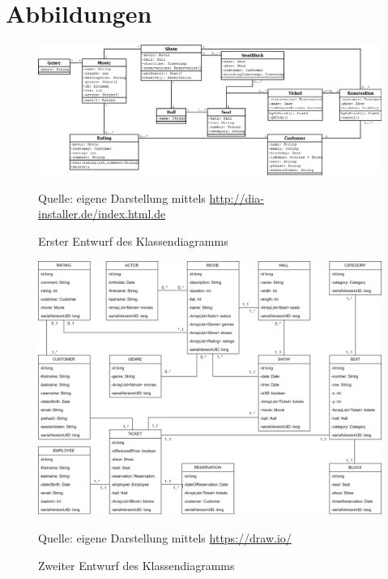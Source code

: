 \chapter{Abbildungen}
\begin{figure}
	\centering
	\includegraphics[keepaspectratio, width=\textwidth, height=\textheight]{img/klassendiagramm_v01}
	\captionsetup{format=hang}
	\caption{Erster Entwurf des Klassendiagramms}
	\small Quelle: eigene Darstellung mittels \url{http://dia-installer.de/index.html.de}
	\label{fig:anhang_klassendiagramm01}
\end{figure}

\begin{figure}
	\centering
	\includegraphics[keepaspectratio, width=\textwidth, height=\textheight]{img/klassendiagramm_v02}
	\captionsetup{format=hang}
	\caption{Zweiter Entwurf des Klassendiagramms}
	\small Quelle: eigene Darstellung mittels \url{https://draw.io/} 
	\label{fig:anhang_klassendiagramm02}
\end{figure}

